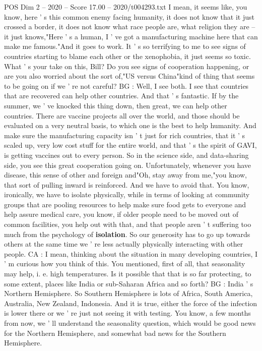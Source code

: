 \begin{textsample}{POS Dim 2 – 2020 – Score 17.00 – 2020/t004293.txt}
I mean, it seems like, you know, here ' s this common enemy facing humanity, it does not know that it just crossed a border, it does not know what race people are, what religion they are -- it just knows,"Here ' s a human, I ' ve got a manufacturing machine here that can make me famous."And it goes to work.
It ' s so terrifying to me to see signs of countries starting to blame each other or the xenophobia, it just seems so toxic.
What ' s your take on this, Bill?
Do you see signs of cooperation happening, or are you also worried about the sort of,"US versus China"kind of thing that seems to be going on if we ' re not careful?
BG : Well, I see both.
I see that countries that are recovered can help other countries.
And that ' s fantastic.
If by the summer, we ' ve knocked this thing down, then great, we can help other countries.
There are vaccine projects all over the world, and those should be evaluated on a very neutral basis, to which one is the best to help humanity.
And make sure the manufacturing capacity isn ' t just for rich countries, that it ' s scaled up, very low cost stuff for the entire world, and that ' s the spirit of GAVI, is getting vaccines out to every person.
So in the science side, and data-sharing side, you see this great cooperation going on.
Unfortunately, whenever you have disease, this sense of other and foreign and"Oh, stay away from me,"you know, that sort of pulling inward is reinforced.
And we have to avoid that.
You know, ironically, we have to isolate physically, while in terms of looking at community groups that are pooling resources to help make sure food gets to everyone and help assure medical care, you know, if older people need to be moved out of common facilities, you help out with that, and that people aren ' t suffering too much from the psychology of \textbf{isolation}.
So our generosity has to go up towards others at the same time we ' re less actually physically interacting with other people.
CA : I mean, thinking about the situation in many developing countries, I ' m curious how you think of this.
You mentioned, first of all, that seasonality may help, i. e. high temperatures.
Is it possible that that is so far protecting, to some extent, places like India or sub-Saharan Africa and so forth?
BG : India ' s Northern Hemisphere.
So Southern Hemisphere is lots of Africa, South America, Australia, New Zealand, Indonesia.
And it is true, either the force of the infection is lower there or we ' re just not seeing it with testing.
You know, a few months from now, we ' ll understand the seasonality question, which would be good news for the Northern Hemisphere, and somewhat bad news for the Southern Hemisphere.

\end{textsample}
